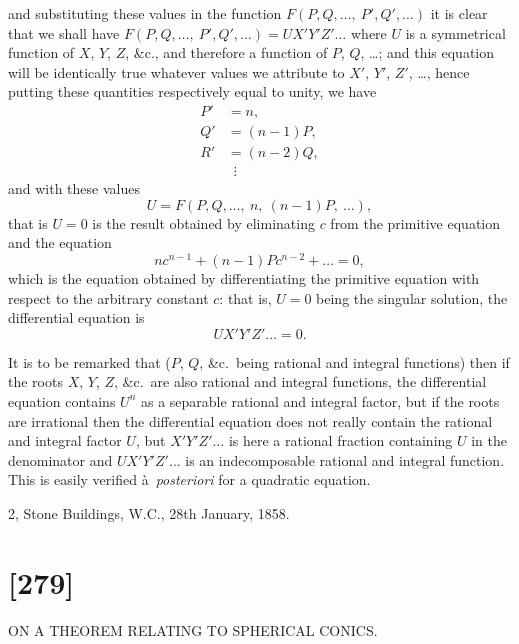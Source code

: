 \documentclass[11pt,a4paper]{book}
\begin{document}
and substituting these values in the function $F(P, Q, \ldots,\ P', Q', \ldots)$ it is clear that we
shall have $F(P, Q, \ldots,\ P', Q', \ldots) = UX'Y'Z'\ldots$ where $U$ is a symmetrical function of
$X$, $Y$, $Z$, \&c., and therefore a function of $P$, $Q$, \ldots; and this equation will be identically
true whatever values we attribute to $X'$, $Y'$, $Z'$, \ldots, hence putting these quantities
respectively equal to unity, we have
\begin{align*}
P' &= n,\\
Q' &= (n - 1)P,\\
R' &= (n - 2)Q,\\
&\ \;\vdots
\end{align*}
and with these values
\[
U = F(P, Q, \ldots,\ n,\ (n - 1)P,\ \ldots),
\]
that is $U = 0$ is the result obtained by eliminating $c$ from the primitive equation and
the equation
\[
nc^{n-1} + (n - 1)Pc^{n-2} + \ldots = 0,
\]
which is the equation obtained by differentiating the primitive equation with respect to
the arbitrary constant $c$: that is, $U = 0$ being the singular solution, the differential
equation is
\[
UX'Y'Z'\ldots = 0.
\]

It is to be remarked that ($P$, $Q$, \&c.\ being rational and integral functions) then
if the roots $X$, $Y$, $Z$, \&c.\ are also rational and integral functions, the differential
equation contains $U^{n}$ as a separable rational and integral factor, but if the roots are
irrational then the differential equation does not really contain the rational and integral
factor $U$, but $X'Y'Z'\ldots$ is here a rational fraction containing $U$ in the denominator
and $UX'Y'Z'\ldots$ is an indecomposable rational and integral function. This is easily
verified \`a~\textit{posteriori} for a quadratic equation.

\begin{flushright}
2, Stone Buildings, W.C., 28th January, 1858.
\end{flushright}


\newpage
\section*{[279]}
\begin{center}
{\large ON A THEOREM RELATING TO SPHERICAL CONICS.}
\end{center}
\end{document}
